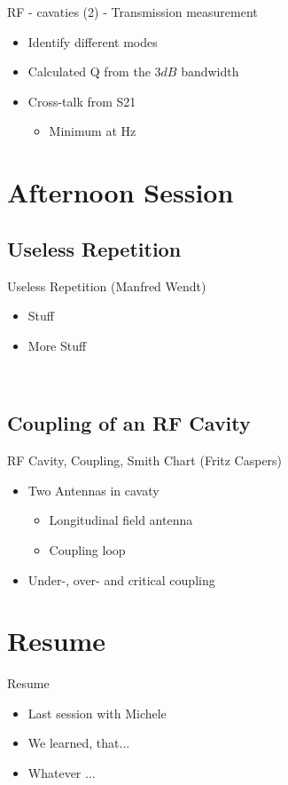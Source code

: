 \documentclass{beamer}
\begin{document}
\begin{frame}[t,fragile]{RF - cavaties (2) - Transmission measurement}
\begin{itemize}
\item Identify different modes 
\item Calculated Q from the $3 dB$ bandwidth
\item Cross-talk from S21
\begin{itemize}
\item Minimum at Hz
\end{itemize}
\end{itemize}
\end{frame}

\section{Afternoon Session}
\subsection{Useless Repetition}
\begin{frame}[t,fragile]{Useless Repetition (Manfred Wendt)}
\begin{itemize}
\item Stuff
\item More Stuff
\end{itemize}
\begin{figure}
  \centering
  \quad
  \\
  \quad
\end{figure}
\end{frame}

\subsection{Coupling of an RF Cavity}
\begin{frame}[t,fragile]{RF Cavity, Coupling, Smith Chart (Fritz Caspers)}
\begin{itemize}
\item  Two Antennas in cavaty
\begin{itemize}
\item Longitudinal field antenna
\item Coupling loop
\end{itemize}
\item Under-, over- and critical coupling
\end{itemize}
\end{frame}

\section{Resume}
\begin{frame}[t,fragile]{Resume}
\begin{itemize}
\item Last session with Michele
\item We learned, that...
\item Whatever ...
\end{itemize}
\end{frame}
\end{document}
